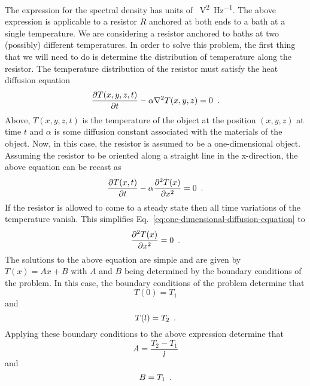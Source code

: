 \documentclass{article}
\begin{document}
The expression for the spectral density has units of
\SI{}{\volt\squared\per\hertz}. The above expression is applicable to a resistor
$ R $ anchored at both ends to a bath at a single temperature. We are
considering a resistor anchored to baths at two (possibly) different
temperatures. In order to solve this problem, the first thing that we will need
to do is determine the distribution of temperature along the resistor. The
temperature distribution of the resistor must satisfy the heat diffusion
equation
\begin{equation}
   \frac{\partial T(x,y,z,t)}{\partial t} - \alpha \nabla^{2}T(x,y,z) = 0
   \enskip.
\end{equation}
Above, $ T(x,y,z,t) $ is the temperature of the object at the position $
\left( x,y,z \right)$ at time $ t $ and $ \alpha $ is some diffusion constant
associated with the materials of the object.
Now, in this case, the resistor is assumed to be a one-dimensional object.
Assuming the resistor to be oriented along a straight line in the x-direction,
the above equation can be recast as
\begin{equation}
   \frac{\partial T(x,t)}{\partial t} - \alpha \frac{\partial^2 T(x)}{\partial x^{2}} = 0
   \enskip. \label{eq:one-dimensional-diffusion-equation}
\end{equation}
If the resistor is allowed to come to a steady state then all time variations of
the temperature vanish. This simplifies
Eq.~\ref{eq:one-dimensional-diffusion-equation} to
\begin{equation}
   \frac{\partial^2 T(x)}{\partial x^{2}} = 0
   \enskip. \label{eq:one-dimensional-diffusion-equation-in-steady-state}
\end{equation}
The solutions to the above equation are simple and are given by $ T(x) = Ax+B $ with $ A
$ and $ B $ being determined by the boundary conditions of the problem. In this
case, the boundary conditions of the problem determine that
\[
   T(0) = T_{1}
\]
and
\[
   T(l) = T_{2} \enskip.
\]
Applying these boundary conditions to the above expression determine that
\[
   A = \frac{T_{2}-T_{1}}{l}
\]
and
\[
   B = T_{1} \enskip.
\]
\end{document}
